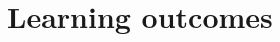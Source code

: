 \documentclass[11pt,a4paper]{article}
\begin{document}
%
%
%
%
%
%
%
%
%
%

\section{Learning outcomes}
\end{document}
